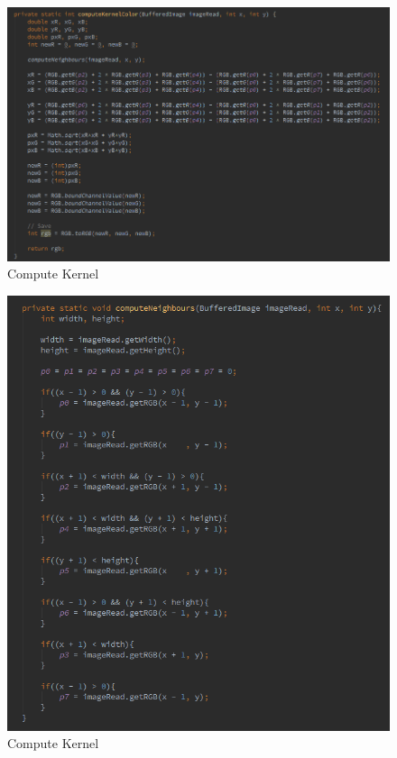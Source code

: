\documentclass{article}
\begin{document}
\begin{figure}[H]
\centering

  \includegraphics[width=0.9\linewidth]{res/algorithms/computeKernel_sobel.png}
  
\caption{Compute Kernel}
\label{fig:compute_kernel_sobel}
\end{figure}


\begin{figure}[H]
\centering

  \includegraphics[width=0.9\linewidth]{res/algorithms/computeNeighbours.png}
  
\caption{Compute Kernel}
\label{fig:compute_neigh_sobel}
\end{figure}
\end{document}
